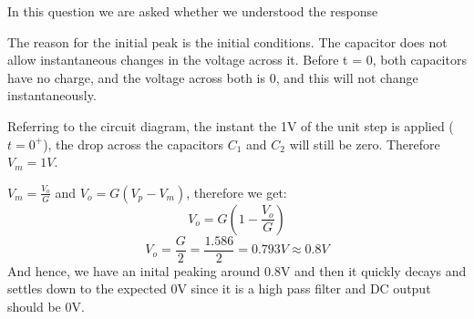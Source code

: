 \documentclass[12pt, a4paper]{article}
\begin{document}
In this question we are asked whether we understood the response

The reason for the initial peak is the initial conditions. The capacitor does not allow instantaneous changes in the voltage across it. Before t = 0, both capacitors have no charge, and the
voltage across both is 0, and this will not change instantaneously.

Referring to the circuit diagram, the instant the 1V of the unit step is applied ($t=0^{+}$), the drop across the capacitors $C_{1}$ and $C_{2}$ will still be zero. Therefore $V_{m}=1V$.

$V_{m}=\frac{V_{o}}{G}$ and $V_{o}=G(V_{p}-V_{m})$, therefore we get:
\begin{equation*}
    V_{o} = G(1-\frac{V_{o}}{G})
\end{equation*}
\begin{equation*}
    V_{o} = \frac{G}{2} = \frac{1.586}{2} = 0.793V \approx 0.8V
\end{equation*}
And hence, we have an inital peaking around 0.8V and then it quickly decays and settles down to the expected 0V since it is a high pass filter and DC output should be 0V.
\end{document}
